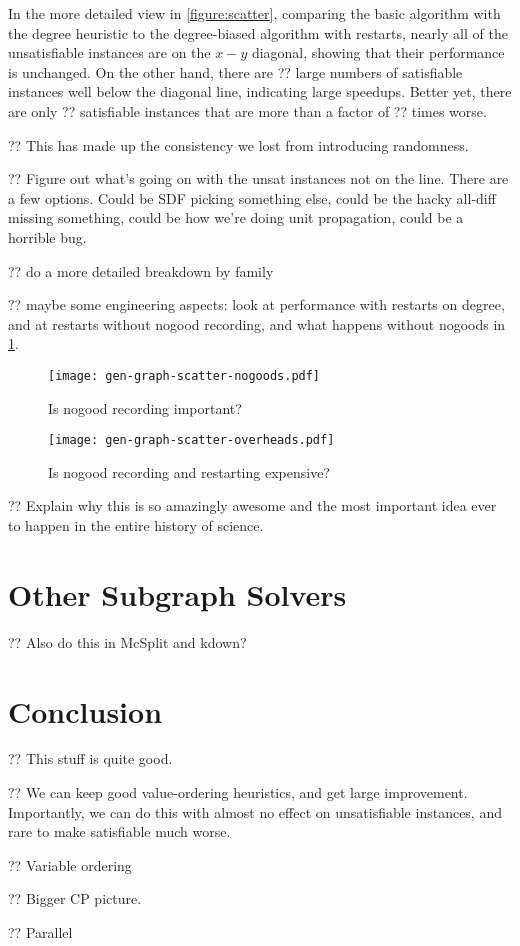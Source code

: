 \documentclass{article}
\begin{document}
In the more detailed view in \cref{figure:scatter}, comparing the basic algorithm with the degree
heuristic to the degree-biased algorithm with restarts, nearly all of the unsatisfiable instances
are on the $x-y$ diagonal, showing that their performance is unchanged. On the other hand, there are
?? large numbers of satisfiable instances well below the diagonal line, indicating large speedups.
Better yet, there are only ?? satisfiable instances that are more than a factor of ?? times worse.

?? This has made up the consistency we lost from introducing randomness.

?? Figure out what's going on with the unsat instances not on the line. There are a few options.
Could be SDF picking something else, could be the hacky all-diff missing something, could be how
we're doing unit propagation, could be a horrible bug.

?? do a more detailed breakdown by family

?? maybe some engineering aspects: look at performance with restarts on degree, and at restarts
without nogood recording, and what happens without nogoods in \cref{figure:scatter-nogoods}.

\begin{figure}[tb]
    \centering
    \texttt{[image: gen-graph-scatter-nogoods.pdf]}

    \caption{Is nogood recording important?}
    \label{figure:scatter-nogoods}
\end{figure}

\begin{figure}[tb]
    \centering
    \texttt{[image: gen-graph-scatter-overheads.pdf]}

    \caption{Is nogood recording and restarting expensive?}
    \label{figure:scatter-overhead}
\end{figure}

?? Explain why this is so amazingly awesome and the most important idea ever to happen in the entire
history of science.

\section{Other Subgraph Solvers}

?? Also do this in McSplit and kdown?

\section{Conclusion}

?? This stuff is quite good.

?? We can keep good value-ordering heuristics, and get large improvement. Importantly, we can do
this with almost no effect on unsatisfiable instances, and rare to make satisfiable much worse.

?? Variable ordering

?? Bigger CP picture.

?? Parallel



\end{document}
